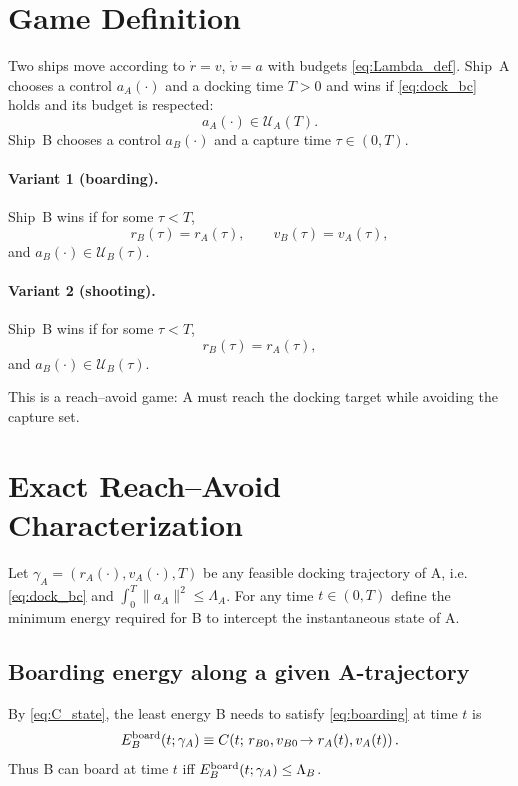 \documentclass[journal, a4paper]{IEEEtran}
\begin{document}
\section{Game Definition}
\label{sec:game_def}

Two ships move according to $\dot r=v$, $\dot v=a$ with budgets \eqref{eq:Lambda_def}.
Ship~A chooses a control $a_A(\cdot)$ and a docking time $T>0$ and wins if \eqref{eq:dock_bc} holds and its budget is respected:
\begin{equation}
a_A(\cdot)\in\mathcal{U}_A(T).
\end{equation}
Ship~B chooses a control $a_B(\cdot)$ and a capture time $\tau\in(0,T)$.

\paragraph{Variant 1 (boarding).}
Ship~B wins if for some $\tau<T$,
\begin{equation}
r_B(\tau)=r_A(\tau),\qquad v_B(\tau)=v_A(\tau),
\label{eq:boarding}
\end{equation}
and $a_B(\cdot)\in\mathcal{U}_B(\tau)$.

\paragraph{Variant 2 (shooting).}
Ship~B wins if for some $\tau<T$,
\begin{equation}
r_B(\tau)=r_A(\tau),
\label{eq:shooting}
\end{equation}
and $a_B(\cdot)\in\mathcal{U}_B(\tau)$.

This is a reach--avoid game: A must reach the docking target while avoiding the capture set.

\section{Exact Reach--Avoid Characterization}
\label{sec:reach_avoid}

Let $\gamma_A=(r_A(\cdot),v_A(\cdot),T)$ be any feasible docking trajectory of A, i.e. \eqref{eq:dock_bc} and $\int_0^T\|a_A\|^2\le\Lambda_A$.
For any time $t\in(0,T)$ define the minimum energy required for B to intercept the instantaneous state of A.

\subsection{Boarding energy along a given A-trajectory}
By \eqref{eq:C_state}, the least energy B needs to satisfy \eqref{eq:boarding} at time $t$ is
\begin{equation}
E_B^{\rm board}(t;\gamma_A)
\equiv
C\!\left(t;\,r_{B0},v_{B0}\!\to r_A(t),v_A(t)\right).
\label{eq:Eboard}
\end{equation}
Thus B can board at time $t$ iff $E_B^{\rm board}(t;\gamma_A)\le\Lambda_B$.
\end{document}
